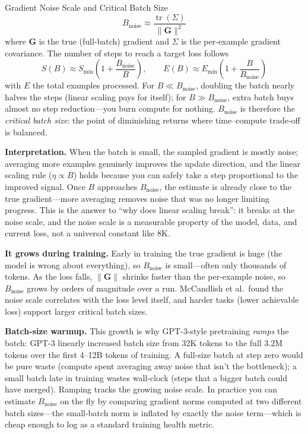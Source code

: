 \begin{mathresult}{Gradient Noise Scale and Critical Batch Size}
\begin{equation}
B_{\text{noise}} \approx \frac{\operatorname{tr}(\Sigma)}{\|\mathbf{G}\|^2}
\end{equation}
where $\mathbf{G}$ is the true (full-batch) gradient and $\Sigma$ is the per-example gradient covariance. The number of steps to reach a target loss follows
\begin{equation}
S(B) \approx S_{\min}\left(1 + \frac{B_{\text{noise}}}{B}\right), \qquad
E(B) \approx E_{\min}\left(1 + \frac{B}{B_{\text{noise}}}\right)
\end{equation}
with $E$ the total examples processed. For $B \ll B_{\text{noise}}$, doubling the batch nearly halves the steps (linear scaling pays for itself); for $B \gg B_{\text{noise}}$, extra batch buys almost no step reduction---you burn compute for nothing. $B_{\text{noise}}$ is therefore the \emph{critical batch size}: the point of diminishing returns where time--compute trade-off is balanced.
\end{mathresult}

\textbf{Interpretation.} When the batch is small, the sampled gradient is mostly noise; averaging more examples genuinely improves the update direction, and the linear scaling rule ($\eta \propto B$) holds because you can safely take a step proportional to the improved signal. Once $B$ approaches $B_{\text{noise}}$, the estimate is already close to the true gradient---more averaging removes noise that was no longer limiting progress. This is the answer to ``why does linear scaling break'': it breaks at the noise scale, and the noise scale is a measurable property of the model, data, and current loss, not a universal constant like 8K.

\textbf{It grows during training.} Early in training the true gradient is huge (the model is wrong about everything), so $B_{\text{noise}}$ is small---often only thousands of tokens. As the loss falls, $\|\mathbf{G}\|$ shrinks faster than the per-example noise, so $B_{\text{noise}}$ grows by orders of magnitude over a run. McCandlish et al.\ found the noise scale correlates with the loss level itself, and harder tasks (lower achievable loss) support larger critical batch sizes.

\textbf{Batch-size warmup.} This growth is why GPT-3-style pretraining \emph{ramps} the batch: GPT-3 linearly increased batch size from 32K tokens to the full 3.2M tokens over the first 4--12B tokens of training. A full-size batch at step zero would be pure waste (compute spent averaging away noise that isn't the bottleneck); a small batch late in training wastes wall-clock (steps that a bigger batch could have merged). Ramping tracks the growing noise scale. In practice you can estimate $B_{\text{noise}}$ on the fly by comparing gradient norms computed at two different batch sizes---the small-batch norm is inflated by exactly the noise term---which is cheap enough to log as a standard training health metric.

